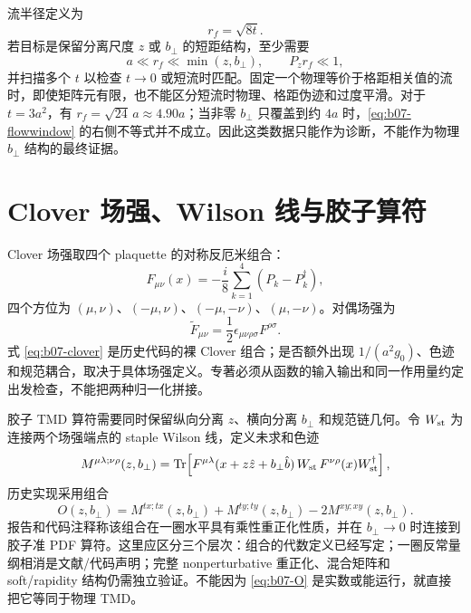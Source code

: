 流半径定义为
\begin{equation}
  r_f=\sqrt{8t}.
  \label{eq:b07-flowradius}
\end{equation}
若目标是保留分离尺度 $z$ 或 $b_\perp$ 的短距结构，至少需要
\begin{equation}
  a\ll r_f\ll \min(z,b_\perp),
  \qquad P_z r_f\ll 1,
  \label{eq:b07-flowwindow}
\end{equation}
并扫描多个 $t$ 以检查 $t\to0$ 或短流时匹配。固定一个物理等价于格距相关值的流时，即使矩阵元有限，也不能区分短流时物理、格距伪迹和过度平滑。对于 $t=3a^2$，有 $r_f=\sqrt{24}\,a\approx4.90a$；当非零 $b_\perp$ 只覆盖到约 $4a$ 时，\eqref{eq:b07-flowwindow} 的右侧不等式并不成立。因此这类数据只能作为诊断，不能作为物理 $b_\perp$ 结构的最终证据。

\section{Clover 场强、Wilson 线与胶子算符}

Clover 场强取四个 plaquette 的对称反厄米组合：
\begin{equation}
  F_{\mu\nu}(x)=-\frac{i}{8}\sum_{k=1}^{4}\left(P_k-P_k^\dagger\right),
  \label{eq:b07-clover}
\end{equation}
四个方位为 $(\mu,\nu)$、$(-\mu,\nu)$、$(-\mu,-\nu)$、$(\mu,-\nu)$。对偶场强为
\begin{equation}
  \widetilde F_{\mu\nu}=\frac12\epsilon_{\mu\nu\rho\sigma}F^{\rho\sigma}.
  \label{eq:b07-dual}
\end{equation}
式 \eqref{eq:b07-clover} 是历史代码的裸 Clover 组合；是否额外出现 $1/(a^2g_0)$、色迹和规范耦合，取决于具体场强定义。专著必须从函数的输入输出和同一作用量约定出发检查，不能把两种归一化拼接。

胶子 TMD 算符需要同时保留纵向分离 $z$、横向分离 $b_\perp$ 和规范链几何。令 $W_{\rm st}$ 为连接两个场强端点的 staple Wilson 线，定义未求和色迹
\begin{equation}
  M^{\mu\lambda;\nu\rho}(z,b_\perp)
  =\operatorname{Tr}\!\left[
  F^{\mu\lambda}(x+z\hat z+b_\perp\hat b)\,
  W_{\rm st}\,
  F^{\nu\rho}(x)W_{\rm st}^\dagger
  \right],
  \label{eq:b07-M}
\end{equation}
历史实现采用组合
\begin{equation}
  O(z,b_\perp)
  =M^{tx;tx}(z,b_\perp)+M^{ty;ty}(z,b_\perp)
  -2M^{xy;xy}(z,b_\perp).
  \label{eq:b07-O}
\end{equation}
报告和代码注释称该组合在一圈水平具有乘性重正化性质，并在 $b_\perp\to0$ 时连接到胶子准 PDF 算符。这里应区分三个层次：组合的代数定义已经写定；一圈反常量纲相消是文献/代码声明；完整 nonperturbative 重正化、混合矩阵和 soft/rapidity 结构仍需独立验证。不能因为 \eqref{eq:b07-O} 是实数或能运行，就直接把它等同于物理 TMD。


